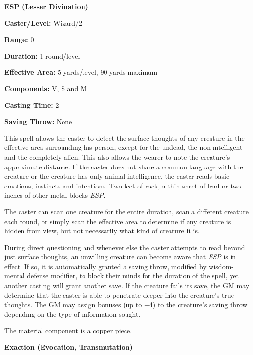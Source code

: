 \begin{multicols}{2}
\begin{minipage}{\columnwidth}
\noindent \textbf{ESP (Lesser Divination)}

\noindent \textbf{Caster/Level:} Wizard/2

\noindent \textbf{Range:} 0

\noindent \textbf{Duration:} 1 round/level

\noindent \textbf{Effective Area:} 5 yards/level, 90 yards maximum

\noindent \textbf{Components:} V, S and M

\noindent \textbf{Casting Time:} 2

\noindent \textbf{Saving Throw:} None

\end{minipage}

This spell allows the caster to detect the surface thoughts of any creature in the effective area surrounding his person, except for the undead, the non-intelligent and the completely alien.  This also allows the wearer to note the creature's approximate distance.  If the caster does not share a common language with the creature or the creature has only animal intelligence, the caster reads basic emotions, instincts and intentions.  Two feet of rock, a thin sheet of lead or two inches of other metal blocks \textit{ESP}.

The caster can scan one creature for the entire duration, scan a different creature each round, or simply scan the effective area to determine if any creature is hidden from view, but not necessarily what kind of creature it is.

During direct questioning and whenever else the caster attempts to read beyond just surface thoughts, an unwilling creature can become aware that \textit{ESP} is in effect.  If so, it is automatically granted a saving throw, modified by wisdom-mental defense modifier, to block their minds for the duration of the spell, yet another casting will grant another save.  If the creature fails its save, the GM may determine that the caster is able to penetrate deeper into the creature's true thoughts.  The GM may assign bonuses (up to +4) to the creature's saving throw depending on the type of information sought.

The material component is a copper piece.

\vspace{1em}

\noindent
\begin{minipage}{\columnwidth}

\noindent \textbf{Exaction (Evocation, Transmutation)}


\end{minipage}
\end{multicols}
